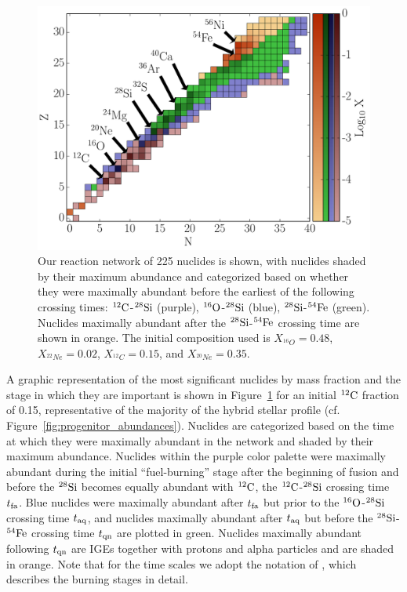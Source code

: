 \documentclass[iop,apj]{emulateapj}
\newcommand{\figref}[1]{Figure~\ref{#1}}
\newcommand{\C}[1]{\ensuremath{{}^{#1}{\rm C}}}
\newcommand{\Ox}[1]{\ensuremath{{}^{#1}{\rm O}}}
\newcommand{\Si}[1]{\ensuremath{{}^{#1}{\rm Si}}}
\newcommand{\Fe}[1]{\ensuremath{{}^{#1}{\rm Fe}}}
\begin{document}
\begin{figure}[t]
	\includegraphics[width=1\linewidth]{figures/detonation_plotfiles/nuclides_xmax_xc12_15.pdf}
	\caption{\label{fig:nuclides_xmax} Our reaction network of 225 nuclides is shown, with nuclides shaded by their maximum abundance and categorized based on whether they were maximally abundant before the earliest of the following crossing times: \C{12}-\Si{28} (purple), \Ox{16}-\Si{28} (blue), \Si{28}-\Fe{54} (green). Nuclides maximally abundant after the \Si{28}-\Fe{54} crossing time are shown in orange.
		The initial composition used 
		is $X_{^{16}O} = 0.48$, $X_{^{22}Ne} = 0.02$, $X_{^{12}C} = 0.15$, and $X_{^{20}Ne} = 0.35$.
	}
\end{figure}

A graphic representation of the most significant nuclides by mass
fraction and the stage in which they are important is shown in
\figref{fig:nuclides_xmax} for an initial \C{12} fraction of 0.15,
representative of the majority of the hybrid stellar profile
(cf. \figref{fig:progenitor_abundances}). Nuclides are categorized
based on the time at which they were maximally abundant in the network
and shaded by their maximum abundance.  Nuclides within the purple
color palette were maximally abundant during the initial
``fuel-burning'' stage after the beginning of fusion and before the
\Si{28} becomes equally abundant with \C{12}, the \C{12}-\Si{28}
crossing time $t_{\rm fa}$.  Blue nuclides were maximally abundant
after $t_{\rm fa}$ but prior to the \Ox{16}-\Si{28} crossing time
$t_{\rm aq}$, and nuclides maximally abundant after $t_{\rm aq}$ but
before the \Si{28}-\Fe{54} crossing time $t_{\rm qn}$ are plotted in
green. Nuclides maximally abundant following $t_{\rm qn}$ are IGEs
together with protons and alpha particles and are shaded in
orange. Note that for the time scales we adopt the notation of
\citep{townetal15}, which describes the burning stages in detail.
\end{document}
